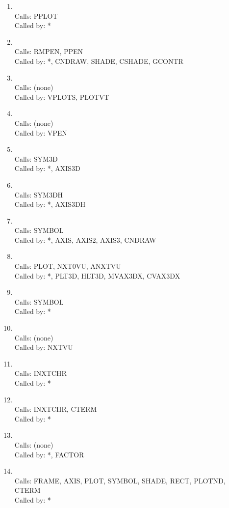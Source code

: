 \documentclass[11pt]{report}
\begin{document}
\begin{enumerate}
\item {}
\\ Calls:  PPLOT
\\ Called by: *
\item {}
\\ Calls:  RMPEN, PPEN
\\ Called by: *, CNDRAW, SHADE, CSHADE, GCONTR
\item {}
\\ Calls:  (none)
\\ Called by: VPLOTS, PLOTVT
\item {}
\\ Calls:  (none)
\\ Called by: VPEN
\item {}
\\ Calls:  SYM3D
\\ Called by: *, AXIS3D
\item {}
\\ Calls:  SYM3DH
\\ Called by: *, AXIS3DH
\item {}
\\ Calls:  SYMBOL
\\ Called by: *, AXIS, AXIS2, AXIS3, CNDRAW
\item {}
\\ Calls:  PLOT, NXT0VU, ANXTVU
\\ Called by: *, PLT3D, HLT3D, MVAX3DX, CVAX3DX
\item {}
\\ Calls:  SYMBOL
\\ Called by: *
\item {}
\\ Calls:  (none)
\\ Called by: NXTVU
\item {}
\\ Calls:  INXTCHR
\\ Called by: *
\item {}
\\ Calls:  INXTCHR, CTERM
\\ Called by: *
\item {}
\\ Calls:  (none)
\\ Called by: *, FACTOR
\item {}
\\ Calls:  FRAME, AXIS, PLOT, SYMBOL, SHADE, RECT, PLOTND, 
CTERM
\\ Called by: *

\end{enumerate}
\end{document}

